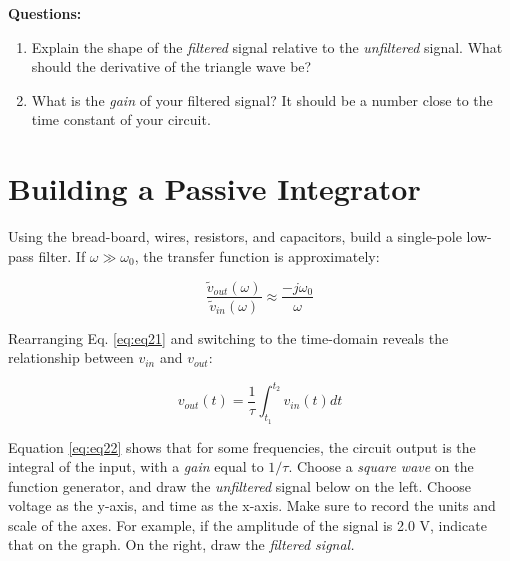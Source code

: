 \documentclass[12pt]{article}
\begin{document}
\textbf{Questions:}
\begin{enumerate}
\item Explain the shape of the \textit{filtered} signal relative to the \textit{unfiltered} signal. What should the derivative of the triangle wave be? \\ \vspace{1.5cm}
\item What is the \textit{gain} of your filtered signal?  It should be a number close to the time constant of your circuit. \\ \vspace{1.5cm}
\end{enumerate}

\section{Building a Passive Integrator}

Using the bread-board, wires, resistors, and capacitors, build a single-pole low-pass filter.  If $\omega \gg \omega_0$, the transfer function is approximately:

\begin{equation}
\frac{\tilde{v}_{out}(\omega)}{\tilde{v}_{in}(\omega)} \approx \frac{-j\omega_0}{\omega}
\label{eq:eq21}
\end{equation}

Rearranging Eq. \ref{eq:eq21} and switching to the time-domain reveals the relationship between $v_{in}$ and $v_{out}$:

\begin{equation}
v_{out}(t) = \frac{1}{\tau} \int_{t_1}^{t_2} v_{in}(t) dt
\label{eq:eq22}
\end{equation}

Equation \ref{eq:eq22} shows that for some frequencies, the circuit output is the integral of the input, with a \textit{gain} equal to $1/\tau$.  Choose a \textit{square wave} on the function generator, and draw the \textit{unfiltered} signal below on the left. Choose voltage as the y-axis, and time as the x-axis.  Make sure to record the units and scale of the axes.  For example, if the amplitude of the signal is 2.0 V, indicate that on the graph. On the right, draw the \textit{filtered signal.}
\end{document}
